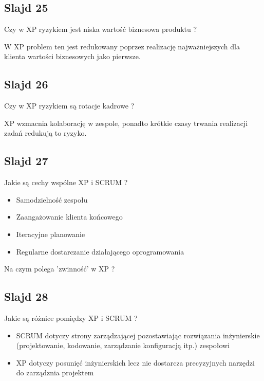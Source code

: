 \documentclass[a4paper,15pt]{article}
\newcommand{\question}[2]{
    \begin{tcolorbox}[colback=mRed!5!white,colframe=mRed,title={Kolokwium 2018 #1}]
        #2
    \end{tcolorbox}
}
\begin{document}
\subsection{Slajd 25}
\begin{framed}
Czy w XP ryzykiem jest niska wartość biznesowa produktu ?
\end{framed}
W XP problem ten jest redukowany poprzez realizację najważniejszych dla klienta wartości biznesowych jako pierwsze.

\subsection{Slajd 26}
\begin{framed}
Czy w XP ryzykiem są rotacje kadrowe ?
\end{framed}
XP wzmacnia kolaborację w zespole, ponadto krótkie czasy trwania realizacji zadań redukują to ryzyko.

\subsection{Slajd 27}
\begin{framed}
Jakie są cechy wspólne XP i SCRUM ?
\end{framed}
\begin{itemize}
\item Samodzielność zespołu
\item Zaangażowanie klienta końcowego
\item Iteracyjne planowanie
\item Regularne dostarczanie działającego oprogramowania
\end{itemize}
\question{}{
Na czym polega 'zwinność' w XP ?
}


\subsection{Slajd 28}
\begin{framed}
Jakie są różnice pomiędzy XP i SCRUM ?
\end{framed}
\begin{itemize}
\item SCRUM dotyczy strony zarządzającej pozostawiając rozwiązania inżynierskie (projektowanie, kodowanie, zarządzanie konfiguracją itp.) zespołowi
\item XP dotyczy posunięć inżynierskich lecz nie dostarcza precyzyjnych narzędzi do zarządznia projektem
\end{itemize}
\end{document}
